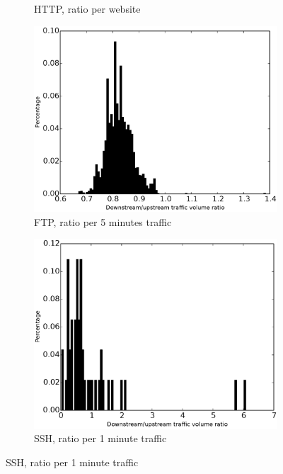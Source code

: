 \begin{figure}
\begin{subfigure}{0.32\linewidth}
\caption{HTTP, ratio per website}
\label{fig:ratio_downstream_upstream_traffic_volume_http}
\end{subfigure}
\begin{subfigure}{0.32\linewidth}
\includegraphics[width=\linewidth]{image/ratio_downstream_upstream_traffic_volume_ftp.eps}
\caption{FTP, ratio per 5 minutes traffic}
\label{ratio_downstream_upstream_traffic_volume_ftp}
\end{subfigure}
\begin{subfigure}{0.32\linewidth}
\includegraphics[width=\linewidth]{image/ratio_downstream_upstream_traffic_volume_ssh.eps}
\caption{SSH, ratio per 1 minute traffic}
\label{ratio_downstream_upstream_traffic_volume_ssh}

\end{subfigure}
\end{figure}
